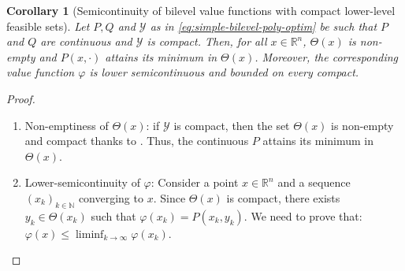 \documentclass{article}
\newcommand*{\cY}{\mathcal{Y}}
\newcommand*{\RR}{\mathbb{R}}
\newcommand*{\NN}{\mathbb{N}}
\newcommand{\firstvar}{x}
\newcommand{\secondvar}{y}
\newcommand{\valoptim}{\varphi_o}
\newcommand{\valbilevel}{\varphi}
\theoremstyle{plain}
\newtheorem{corollary}[theorem]{Corollary}
\theoremstyle{definition}
\begin{document}
\begin{corollary}[Semicontinuity of bilevel value functions with compact lower-level feasible sets]
    \label{lemma:upper-bound-compact-nonconvex-class}
     Let $P, Q$ and $\cY$ as in \eqref{eq:simple-bilevel-poly-optim} be such that $P$ and $Q$ are continuous and $\cY$ is compact. Then, for all $\firstvar \in \RR^n$, $\Theta(\firstvar)$ is non-empty and $P(\firstvar, \cdot)$ attains its minimum in $\Theta(\firstvar)$. Moreover, the corresponding value function $\valbilevel$ is lower semicontinuous and bounded on every compact.
\end{corollary}
\begin{proof}
    \begin{enumerate}[leftmargin=*]
        \item Non-emptiness of $\Theta(\firstvar)$: if $\cY$ is compact, then the set $\Theta(\firstvar)$ is non-empty and compact thanks to . Thus, the continuous $P$ attains its minimum in $\Theta(\firstvar)$.

        \item Lower-semicontinuity of $\valbilevel$: Consider a point $\firstvar \in \RR^n$ and a sequence $(\firstvar_k)_{k \in \NN}$ converging to $\firstvar$. Since $\Theta(\firstvar)$ is compact, there exists $\secondvar_k \in \Theta(\firstvar_k)$ such that $\valbilevel(\firstvar_k) = P(\firstvar_k,\secondvar_k)$. We need to prove that: $\valbilevel(\firstvar) \leq \liminf_{k \to \infty} \valbilevel(\firstvar_k)$. 
        

\end{enumerate}
\end{proof}
\end{document}
